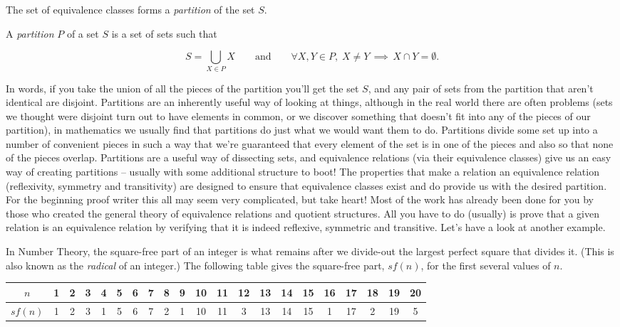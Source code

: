 The set of equivalence
classes forms a  \emph{partition} of the set $S$.

\begin{defi} A \emph{partition} $P$ of a set $S$ is a set of sets such that

\[ S = \bigcup_{X \in P} X \qquad \mbox{and} \qquad %
\forall X, Y \in P, \; X \neq Y \, \implies \, X \cap Y = \emptyset. \]

\end{defi}
 
In words, if you take the union of all the pieces of the partition you'll get the
set $S$, and any pair of sets from the partition that aren't identical are disjoint.  
Partitions are an inherently useful way of looking at things, although in the real world
there are often problems (sets we thought were disjoint turn out to have elements in common,
or we discover something that doesn't fit into any of the pieces of our partition), in
mathematics we usually find that partitions do just what we would want them to do.  
Partitions divide some set up into a number of convenient pieces in such a way that we're
guaranteed that every element of the set is in one of the pieces and also so that none of
the pieces overlap.  Partitions are a useful way of dissecting sets, and equivalence relations
(via their equivalence classes) give us an easy way of creating partitions --
usually with some additional structure to boot!  The 
properties that make a relation an equivalence relation (reflexivity, symmetry and 
transitivity) are designed to ensure that equivalence classes exist and do provide us
with the desired partition.  For the beginning proof writer this all may seem very complicated,
but take heart!  Most of the work has already been done for you by those who created
the general theory of equivalence relations and quotient structures.  All you have
to do (usually) is prove that a given relation is an equivalence relation by verifying
that it is indeed reflexive, symmetric and transitive.  Let's have a look at another
example.

In Number Theory, the  square-free part of an integer is what remains after we divide-out
the largest perfect square that divides it.  (This is also known as the 
\emph{radical} of an integer.)  
The following table gives the
square-free part, $sf(n)$, for the first several values of $n$.

\begin{center}
\begin{tabular}{c|cccccccccccccccccccc}
$n$ & 1 & 2 & 3 & 4 & 5 & 6 & 7 & 8 & 9 & 10 & 11 & 12 & 13 & 14 & 15 & 16 & 17 & 18 & 19 & 20 \\ \hline
$sf(n)$ & 1 & 2 & 3 & 1& 5 & 6 & 7  & 2  & 1 & 10 & 11  & 3 & 13 & 14 & 15 & 1 & 17 & 2  & 19 & 5 \\
\end{tabular}
\end{center}  

